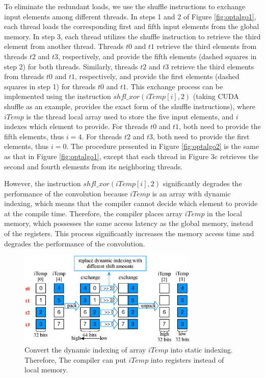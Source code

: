To eliminate the redundant loads, we use the shuffle instructions to exchange input elements among different threads. In steps 1
and 2 of Figure \ref{fig:optalgo1}, each thread loads the corresponding first and fifth input elements from the global memory. In step 3, each
thread utilizes the shuffle instruction to retrieve the third element from another thread. Threads $t0$ and $t1$ retrieve the third elements
from threads $t2$ and $t3$, respectively, and provide the fifth elements (dashed squares in step 2) for both threads.
Similarly, threads $t2$ and $t3$ retrieve the third elements from threads $t0$ and $t1$, respectively, and provide the first
elements (dashed squares in step 1) for threads $t0$ and $t1$. This exchange process can be implemented using the instruction
$shfl\_xor(iTemp[i],2)$ (taking CUDA shuffle as an example, \cite{CUDAtoolkit} provides the exact form of the shuffle instructions), where $iTemp$ is the thread local
array used to store the five input elements, and $i$ indexes which element to provide. For threads $t0$ and $t1$, both need to provide the fifth
elements, thus $i=4$. For threads $t2$ and $t3$, both need to provide the first elements, thus $i=0$. The procedure presented in Figure  \ref{fig:optalgo2} is the same as that in Figure \ref{fig:optalgo1}, except that each thread in Figure 3c retrieves the second and fourth elements from its neighboring threads.

However, the instruction $shfl\_xor(iTemp[i],2)$ significantly degrades the performance of the convolution because $iTemp$ is an array with
dynamic indexing, which means that the compiler cannot decide which element to provide at the compile time. Therefore, the compiler
places array $iTemp$ in the local memory, which possesses the same access latency as the global memory, instead of the registers. This process significantly increases the memory access time and degrades the performance of the convolution.

\begin{figure}[t!]
	\centering
	\includegraphics[width=\columnwidth,height=4.5cm]{./figure/exchange.eps}
\caption{Convert the dynamic indexing of array $iTemp$ into static indexing. Therefore, The compiler can put $iTemp$ into registers instead of local memory.}
\label{fig:exchange}
\end{figure}


